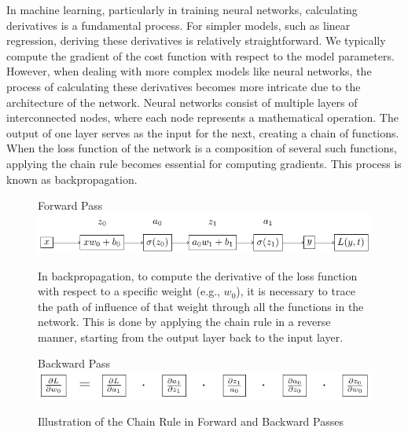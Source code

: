 \documentclass[twoside,11pt]{report}
\begin{document}
    In machine learning, particularly in training neural networks, calculating derivatives is a fundamental process. 
    For simpler models, such as linear regression, deriving these derivatives is relatively straightforward. 
    We typically compute the gradient of the cost function with respect to the model parameters. However, 
    when dealing with more complex models like neural networks, the process of calculating these derivatives 
    becomes more intricate due to the architecture of the network.
    Neural networks consist of multiple layers of interconnected nodes, where each node represents a mathematical 
    operation. The output of one layer serves as the input for the next, creating a chain of functions. 
    When the loss function of the network is a composition of several such functions, applying the chain rule 
    becomes essential for computing gradients. This process is known as backpropagation.

    \begin{figure}[!h]
        \begin{center}
            Forward Pass\\
            \includegraphics[width=\textwidth]{tikzfigures/forward.pdf}\\
        \end{center}
        In backpropagation, to compute the derivative of the loss function with respect to a specific 
        weight (e.g., $w_0$), it is necessary to trace the path of influence of that weight through all 
        the functions in the network. This is done by applying the chain rule in a reverse manner, 
        starting from the output layer back to the input layer.
        \begin{center}
            Backward Pass\\
            \hspace{1cm}
            \includegraphics[width=\textwidth]{tikzfigures/backwards.pdf}
        \end{center}
        \caption{Illustration of the Chain Rule in Forward and Backward Passes}\label{fig:chainrule}
    \end{figure}
\end{document}
